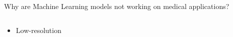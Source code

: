 \documentclass[8pt,xcolor=table,aspectratio=169]{beamer}
\begin{document}
\begin{frame}{Why are Machine Learning models not working on medical applications?}
\begin{columns}[t]
\begin{column}{0.5\textwidth}
\begin{itemize}
 \item Low-resolution

 \begin{center}
\end{center}



% 


\end{itemize}


\end{column}
\end{columns}

 
 
\end{frame}

\newcommand{\diagfld}{brgm_diagram}
\newcommand{\fstikz}[1]{\footnotesize{#1}}
\end{document}
